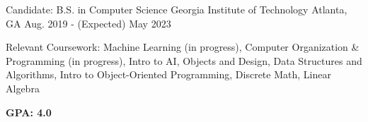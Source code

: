 


\begin{cventries}

\cventry
{Candidate: B.S. in Computer Science}
{Georgia Institute of Technology}
{Atlanta, GA}
{Aug. 2019 - (Expected) May 2023}
{\begin{cvitems}
\item {Relevant Coursework: Machine Learning (in progress), Computer Organization \& Programming (in progress), Intro to AI, Objects and Design, Data Structures and Algorithms, Intro to Object-Oriented Programming, Discrete Math, Linear Algebra}
\item \textbf{GPA: 4.0}
\end{cvitems}
}


\end{cventries}
